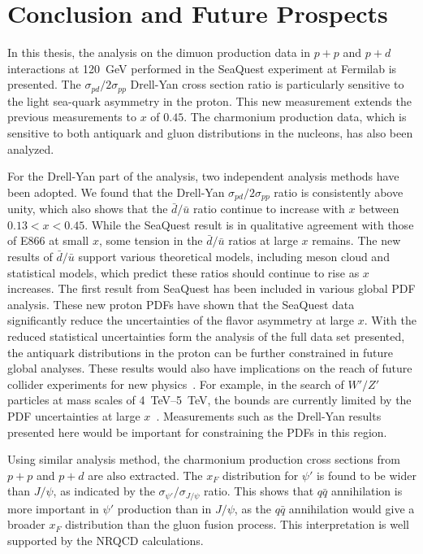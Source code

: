 \documentclass[../main.tex]{subfiles}
\begin{document}
\ifSubfilesClassLoaded{
	\mainmatter
	\setcounter{chapter}{5}
}{}

\chapter{Conclusion and Future Prospects}
\label{ch:conclusion}
In this thesis, the analysis on the dimuon production data in $p+p$ and $p+d$ interactions 
at \SI{120}{\GeV} performed in the SeaQuest experiment at Fermilab is presented.
The $\sigma_{pd}/2\sigma_{pp}$ Drell-Yan cross section ratio
is particularly sensitive to the light sea-quark asymmetry in the proton. 
This new measurement extends the previous measurements to $x$ of $0.45$.
The charmonium production data, which is sensitive to both antiquark and gluon
distributions in the nucleons, has also been analyzed.

For the Drell-Yan part of the analysis, two independent analysis methods have been adopted.
We found that the Drell-Yan $\sigma_{pd}/2\sigma_{pp}$ ratio is consistently above unity, which
also shows that the $\bar{d}/\bar{u}$ ratio continue to increase with $x$ between $0.13<x<0.45$.
While the SeaQuest result is in qualitative agreement with those of E866 at small $x$,
some tension in the $\bar{d}/\bar{u}$ ratios at large $x$ remains.
The new results of $\bar{d}/\bar{u}$ support various theoretical models, including meson cloud
and statistical models, which predict these ratios should continue to rise as $x$ increases.
The first result from SeaQuest has been included in various global PDF analysis.
These new proton PDFs have shown that the SeaQuest data significantly reduce the uncertainties
of the flavor asymmetry at large $x$.
With the reduced statistical uncertainties form the analysis of the full data set presented,
the antiquark distributions in the proton can be further constrained in future global analyses.
These results would also have implications on the reach of future collider experiments for new physics~\cite{amoroso2023}.
For example, in the search of $W'/Z'$ particles at mass scales of \SIrange{4}{5}{\TeV},
the bounds are currently limited by the PDF uncertainties at large $x$~\cite{brady2012}.
Measurements such as the Drell-Yan results presented here would be important for constraining the PDFs in this region.

Using similar analysis method, the charmonium production cross sections from $p+p$ and $p+d$ are also extracted.
The $x_F$ distribution for $\psi'$ is found to be wider than $J/\psi$, as indicated by the $\sigma_{\psi'}/\sigma_{J/\psi}$ ratio.
This shows that $q\bar{q}$ annihilation is more important in $\psi'$ production than in $J/\psi$,
as the $q\bar{q}$ annihilation would give a broader $x_F$ distribution than the gluon fusion process.
This interpretation is well supported by the NRQCD calculations.
\end{document}
